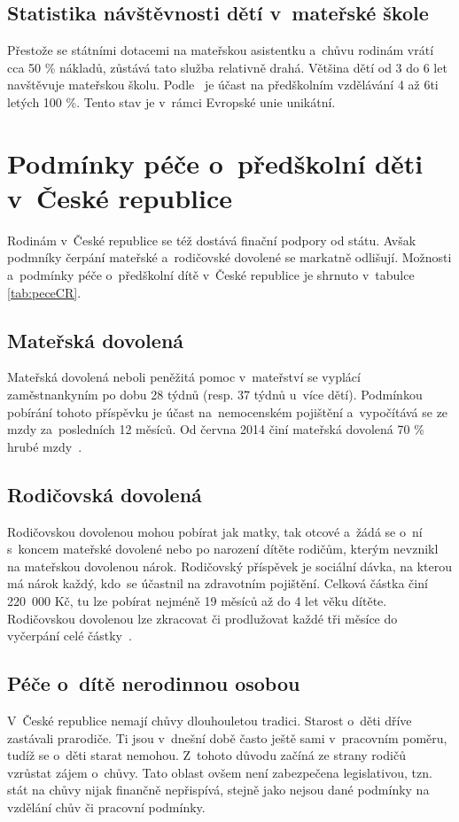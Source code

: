 			\subsection{Statistika návštěvnosti dětí v mateřské škole}
			\label{statistika}
				Přestože se státními dotacemi na mateřskou asistentku a~chůvu rodinám vrátí cca 50 \% nákladů, zůstává tato služba relativně drahá. Většina dětí od 3 do 6 let navštěvuje mateřskou školu. Podle~\cite{Eurydice} je účast na předškolním vzdělávání 4 až 6ti letých 100 \%. Tento stav je v~rámci Evropské unie unikátní. 
			

		\section{Podmínky péče o~předškolní děti v~České republice}
		Rodinám v~České republice se též dostává finační podpory od státu. Avšak podmníky čerpání mateřské a~rodičovské dovolené se markatně odlišují. Možnosti a~podmínky péče o~předškolní dítě v~České republice je shrnuto v~tabulce \ref{tab:peceCR}.

			\subsection{Mateřská dovolená}
				Mateřská dovolená neboli peněžitá pomoc v mateřství se vyplácí zaměstnankyním po dobu 28 týdnů (resp. 37 týdnů u~více dětí). Podmínkou pobírání tohoto příspěvku je účast na nemocenském pojištění a~vypočítává se ze mzdy za posledních 12 měsíců. Od června 2014 činí mateřská dovolená 70 \% hrubé mzdy~\citep{materska}.

			\subsection{Rodičovská dovolená}
				Rodičovskou dovolenou mohou pobírat jak matky, tak otcové a~žádá se o~ní s koncem mateřské dovolené nebo po narození dítěte rodičům, kterým nevznikl na mateřskou dovolenou nárok. Rodičovský příspěvek je sociální dávka, na kterou má nárok každý, kdo se účastnil na zdravotním pojištění. Celková částka činí 220 000 Kč, tu lze pobírat nejméně 19 měsíců až do 4 let věku dítěte. Rodičovskou dovolenou lze zkracovat či prodlužovat každé tři měsíce do vyčerpání celé částky~\citep{rodicovska}.

			\subsection{Péče o~dítě nerodinnou osobou}
				V~České republice nemají chůvy dlouhouletou tradici. Starost o~děti dříve zastávali prarodiče. Ti jsou v~dnešní době často ještě sami v~pracovním poměru, tudíž se o~děti starat nemohou. Z~tohoto důvodu začíná ze strany rodičů vzrůstat zájem o~chůvy. Tato oblast ovšem není zabezpečena legislativou, tzn. stát na chůvy nijak finančně nepřispívá, stejně jako nejsou dané podmínky na vzdělání chův či pracovní podmínky. 


